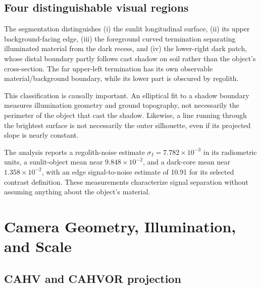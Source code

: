 \documentclass[11pt,letterpaper]{article}
\begin{document}
\subsection{Four distinguishable visual regions}
\label{sec:regions}

The segmentation distinguishes (i) the sunlit longitudinal surface, (ii) its upper background-facing edge, (iii) the foreground curved termination separating illuminated material from the dark recess, and (iv) the lower-right dark patch, whose distal boundary partly follows cast shadow on soil rather than the object's cross-section. The far upper-left termination has its own observable material/background boundary, while its lower part is obscured by regolith.

This classification is causally important. An elliptical fit to a shadow boundary measures illumination geometry and ground topography, not necessarily the perimeter of the object that cast the shadow. Likewise, a line running through the brightest surface is not necessarily the outer silhouette, even if its projected slope is nearly constant.

The analysis reports a regolith-noise estimate \(\sigma_I=7.782\times10^{-3}\) in its radiometric units, a sunlit-object mean near \(9.848\times10^{-2}\), and a dark-core mean near \(1.358\times10^{-2}\), with an edge signal-to-noise estimate of 10.91 for its selected contrast definition. These measurements characterize signal separation without assuming anything about the object's material.

\section{Camera Geometry, Illumination, and Scale}
\label{sec:camera}

\subsection{CAHV and CAHVOR projection}
\end{document}
